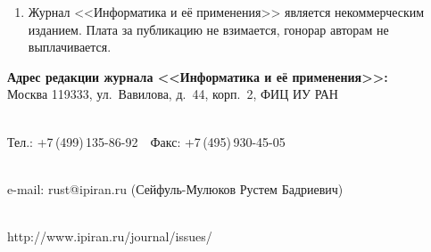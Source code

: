 {\begin{enumerate}[1.]
\item Журнал <<Информатика и её применения>> является некоммерческим изданием.
Плата за публикацию не взимается, гонорар авторам не выплачивается.
\end{enumerate}



\def\leftfootline{\small{\textbf{\thepage}
\hfill ИНФОРМАТИКА И ЕЁ ПРИМЕНЕНИЯ\ \ \ том\ 9\ \ \ выпуск\ 2\ \ \ 2015}
}%
 \def\rightfootline{\small{ИНФОРМАТИКА И ЕЁ ПРИМЕНЕНИЯ\ \ \ том\ 9\ \ \ выпуск\ 2\ \ \ 2015
\hfill \textbf{\thepage}}}



\begin{center}

\textbf{Адрес редакции журнала <<Информатика и её применения>>:} \\




Москва 119333, ул.~Вавилова, д.~44, корп.~2, ФИЦ ИУ РАН\\[-10pt]

\

Тел.: +7\,(499)\,135-86-92\ \ Факс:  +7\,(495)\,930-45-05\\[-10pt]

 \

e-mail:   {\sf rust@ipiran.ru} (Сейфуль-Мулюков Рустем Бадриевич)\\[-10pt]

\

{\sf http://www.ipiran.ru/journal/issues/}
\end{center}
}


\def\leftkol{Правила подготовки рукописей  для публикации в журнале
<<Информатика и её применения>>}

\def\rightkol{Правила подготовки рукописей  для публикации в журнале
<<Информатика и её применения>>}


\def\leftfootline{\small{\textbf{\thepage}
\hfill ИНФОРМАТИКА И ЕЁ ПРИМЕНЕНИЯ\ \ \ том\ 9\ \ \ выпуск\ 2\ \ \ 2015}
}%
 \def\rightfootline{\small{ИНФОРМАТИКА И ЕЁ ПРИМЕНЕНИЯ\ \ \ том\ 9\ \ \ выпуск\ 2\ \ \ 2015
\hfill \textbf{\thepage}}} 
